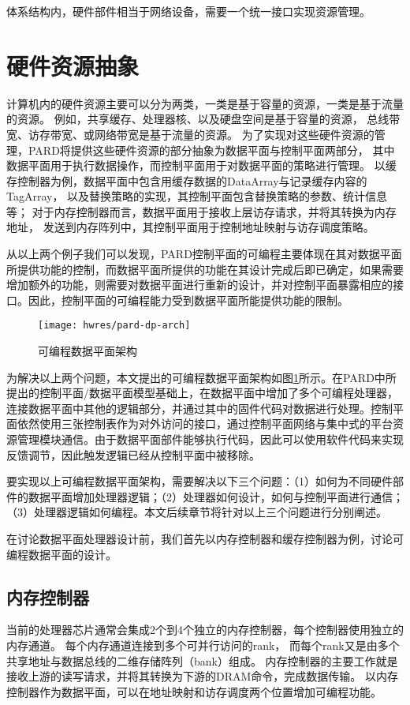 体系结构内，硬件部件相当于网络设备，需要一个统一接口实现资源管理。


\section{硬件资源抽象}

计算机内的硬件资源主要可以分为两类，一类是基于容量的资源，一类是基于流量的资源。
例如，共享缓存、处理器核、以及硬盘空间是基于容量的资源，
总线带宽、访存带宽、或网络带宽是基于流量的资源。
为了实现对这些硬件资源的管理，PARD将提供这些硬件资源的部分抽象为数据平面与控制平面两部分，
其中数据平面用于执行数据操作，而控制平面用于对数据平面的策略进行管理。
以缓存控制器为例，数据平面中包含用缓存数据的DataArray与记录缓存内容的TagArray，
以及替换策略的实现，其控制平面包含替换策略的参数、统计信息等；
对于内存控制器而言，数据平面用于接收上层访存请求，并将其转换为内存地址，
发送到内存阵列中，其控制平面用于控制地址映射与访存调度策略。

从以上两个例子我们可以发现，PARD控制平面的可编程主要体现在其对数据平面所提供功能的控制，而数据平面所提供的功能在其设计完成后即已确定，如果需要增加额外的功能，则需要对数据平面进行重新的设计，并对控制平面暴露相应的接口。因此，控制平面的可编程能力受到数据平面所能提供功能的限制。

\begin{figure}[tb]
  \centering
  \texttt{[image: hwres/pard-dp-arch]}
  \caption{可编程数据平面架构}
  \label{fig:pard-dp-arch}
\end{figure}

为解决以上两个问题，本文提出的可编程数据平面架构如图\ref{fig:pard-dp-arch}所示。在PARD中所提出的控制平面/数据平面模型基础上，在数据平面中增加了多个可编程处理器，连接数据平面中其他的逻辑部分，并通过其中的固件代码对数据进行处理。控制平面依然使用三张控制表作为对外访问的接口，通过控制平面网络与集中式的平台资源管理模块通信。由于数据平面部件能够执行代码，因此可以使用软件代码来实现反馈调节，因此触发逻辑已经从控制平面中被移除。
 
要实现以上可编程数据平面架构，需要解决以下三个问题：（1）如何为不同硬件部件的数据平面增加处理器逻辑；（2）处理器如何设计，如何与控制平面进行通信；（3）处理器逻辑如何编程。本文后续章节将针对以上三个问题进行分别阐述。

在讨论数据平面处理器设计前，我们首先以内存控制器和缓存控制器为例，讨论可编程数据平面的设计。

\subsection{内存控制器}
当前的处理器芯片通常会集成2个到4个独立的内存控制器，每个控制器使用独立的内存通道。
每个内存通道连接到多个可并行访问的rank，
而每个rank又是由多个共享地址与数据总线的二维存储阵列（bank）组成。
内存控制器的主要工作就是接收上游的读写请求，并将其转换为下游的DRAM命令，完成数据传输。
以内存控制器作为数据平面，可以在地址映射和访存调度两个位置增加可编程功能。

